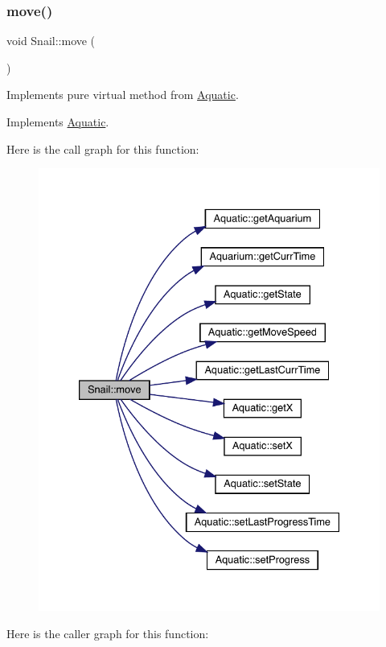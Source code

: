 \subsubsection{\texorpdfstring{move()}{move()}}
{\footnotesize\ttfamily void Snail\+::move (\begin{DoxyParamCaption}{ }\end{DoxyParamCaption})\hspace{0.3cm}{\ttfamily [virtual]}}



Implements pure virtual method from \mbox{\hyperlink{class_aquatic}{Aquatic}}. 



Implements \mbox{\hyperlink{class_aquatic_a962e93c804814eeaf3cea6e26698eef7}{Aquatic}}.

Here is the call graph for this function\+:\nopagebreak
\begin{figure}[H]
\begin{center}
\leavevmode
\includegraphics[width=333pt]{class_snail_af5892ec122d9199480c813b74488256b_cgraph}
\end{center}
\end{figure}
Here is the caller graph for this function\+:
